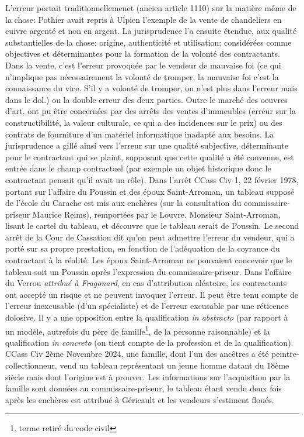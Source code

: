 \documentclass[math]{cours}
\begin{document}
L'erreur portait traditionnellemenet (ancien article 1110) sur la matière même de la chose: Pothier avait repris à Ulpien l'exemple de la vente de chandeliers en cuivre argenté et non en argent.
La jurisprudence l'a ensuite étendue, aux qualité substantielles de la chose: origine, authenticité et utilisation; considérées comme objectives et déterminantes pour la formation de la volonté des contractants.
Dans la vente, c'est l'erreur provoquée par le vendeur de mauvaise foi (ce qui n'implique pas nécessairement la volonté de tromper, la mauvaise foi c'est la connaissance du vice. S'il y a volonté de tromper, on n'est plus dans l'erreur mais dans le dol.) ou la double erreur des deux parties.
Outre le marché des oeuvres d'art, ont pu être concernées par des arrêts des ventes d'immeubles (erreur sur la constructibilité, la valeur culturale, ce qui a des incidences sur le prix) ou des contrats de fourniture d'un matériel informatique inadapté aux besoins.
La jurisprudence a gillé ainsi vers l'erreur sur une qualité subjective, déterminante pour le contractant qui se plaint, supposant que cette qualité a été convenue, est entrée dans le champ contractuel (par exemple un objet historique donc le contractant pensait qu'il avait un rôle).
Dans l'arrêt CCass Civ 1, 22 février 1978, portant sur l'affaire du Poussin et des époux Saint-Arroman, un tableau supposé de l'école du Carache est mis aux enchères (sur la consultation du commissaire-priseur Maurice Reims), remportées par le Louvre.
Monsieur Saint-Arroman, lisant le cartel du tableau, et découvre que le tableau serait de Poussin.
Le second arrêt de la Cour de Cassation dit qu'on peut admettre l'erreur du vendeur, qui a porté sur sa propre prestation, en fonction de l'adéquation de la coyrance du contractant à la réalité.
Les époux Saint-Arroman ne pouvaient concevoir que le tableau soit un Poussin après l'expression du commissaire-priseur.
Dans l'affaire du Verrou \emph{attribué à Fragonard}, en cas d'attribution aléatoire, les contractants ont accepté un risque et ne peuvent invoquer l'erreur.
Il peut être tenu compte de l'erreur inexcusable (d'un spécialiste) et de l'erreur excusable par une réticence dolosive.
Il y a une opposition entre la qualification \emph{in abstracto} (par rapport à un modèle, autrefois du père de famille\footnote{terme retiré du code civil}, de la personne raisonnable) et la qualification \emph{in concreto} (on tient compte de la profession et de la qualification).
CCass Civ 2ème Novembre 2024, une famille, dont l'un des ancêtres a été peintre-collectionneur, vend un tableau représentant un jeune homme datant du 18ème siècle mais dont l'origine est à prouver. Les informations sur l'acquisition par la famille sont données au commissaire-priseur, le tableau étant vendu deux fois après les enchères est attribué à Géricault et les vendeurs s'estiment floués.
\end{document}
